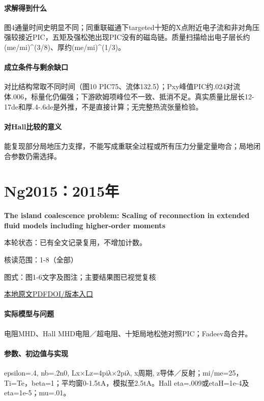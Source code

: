 \paragraph{求解得到什么}图4通量时间史明显不同；同重联磁通下targeted十矩的X点附近电子流和非对角压强较接近PIC，五矩及强松弛出现PIC没有的磁岛链。质量扫描给出电子层长约(me/mi)\textasciicircum{}(3/8)、厚约(me/mi)\textasciicircum{}(1/3)。

\paragraph{成立条件与剩余缺口}对比结构常取不同时间（图10 PIC75、流体132.5）；Pxy峰值PIC约.024对流体.006，标量化仍偏强；下游欧姆项峰位不一致、抵消不足。真实质量比层长12-17de和厚.4-.6de是外推，不是直接计算；无完整热流张量检验。

\paragraph{对Hall比较的意义}能复现部分局地压力支撑，不能写成重联全过程或所有压力分量定量吻合；局地闭合参数仍需选择。

\section{Ng2015：2015年}\label{paper:Ng2015}

\textbf{The island coalescence problem: Scaling of reconnection in extended fluid models including higher-order moments}\citep{Ng2015}

\textsf{本轮状态：}已有全文记录复用，不增加计数。

\textsf{核读范围：}1-8（全部）\par\textsf{图式：}图1-6文字及图注；主要结果图已视觉复核

\href{run:../../papers/Ng2015.pdf}{本地原文PDF}\quad\href{https://doi.org/10.1063/1.4935302}{DOI/版本入口}

\paragraph{实际模型与问题}电阻MHD、Hall MHD电阻／超电阻、十矩局地松弛对照PIC；Fadeev岛合并。

\paragraph{参数、初边值与实现}epsilon=.4, nb=.2n0, Lx×Lz=4piλ×2piλ, x周期, z导体／反射；mi/me=25，Ti=Te，beta=1；平均窗0-1.5tA，模拟至2.5tA。Hall eta=.009或etaH=1e-4及eta=1e-5；mu=.01。

